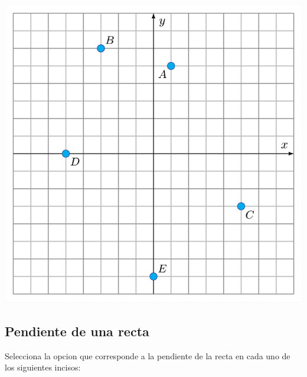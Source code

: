 \documentclass[12pt,addpoints,answers]{evalua}
\begin{document}
\begin{questions}
\begin{multicols}{2}
            \includegraphics[width=0.8\linewidth]{../images/imagen_plano01.png}
      \end{multicols}

      



      
	\subsection{Pendiente de una recta}

      \question[8] Selecciona la opcion que corresponde a la pendiente de la recta en cada uno de los siguientes incisos:
    
      \begin{multicols}{2}
            \begin{parts}

\end{parts}
\end{multicols}
\end{questions}
\end{document}
